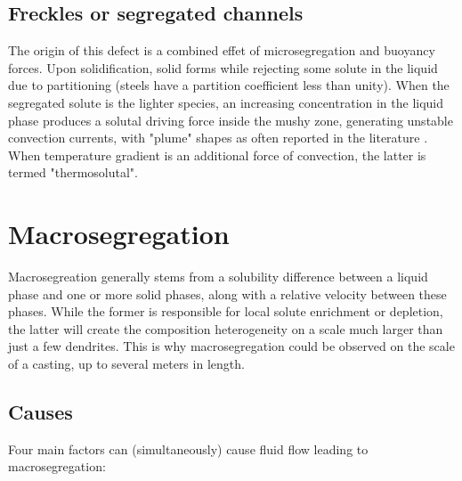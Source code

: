\subsection*{Freckles or segregated channels} 
The origin of this defect is a combined effet of microsegregation and buoyancy forces. 
Upon solidification, solid forms while rejecting some solute in the liquid due to partitioning (steels have a partition coefficient less than unity).
When the segregated solute is the lighter species, an increasing concentration in the liquid phase produces a solutal driving force inside the mushy zone, generating unstable convection currents, with "plume" shapes as often reported in the literature \citep{sarazin_studies_1992, schneider_modeling_1997, shevchenko_chimney_2013}. When temperature gradient is an additional force of convection, the latter is termed "thermosolutal".
\section{Macrosegregation}
Macrosegreation generally stems from a solubility difference between a liquid phase and one or more solid phases, along with
a relative velocity between these phases. While the former is responsible for local solute enrichment or depletion, the latter
will create the composition heterogeneity on a scale much larger than just a few dendrites.
This is why macrosegregation could be observed on the scale of a casting, up to several meters in length. 
\subsection{Causes}
Four main factors can (simultaneously) cause fluid flow leading to macrosegregation:
